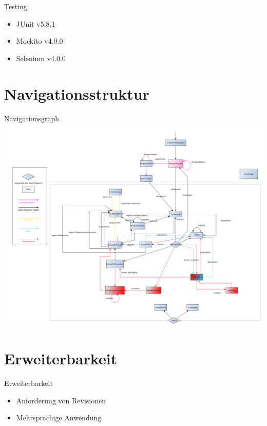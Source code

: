 \documentclass{beamer}
\begin{document}
    \begin{frame}{Testing}
        \begin{itemize}
            \item JUnit v5.8.1
            \item Mockito v4.0.0
            \item Selenium v4.0.0
        \end{itemize}
    \end{frame}


    \section{Navigationsstruktur}
    \begin{frame}{Navigationsgraph}
        \centering
        \includegraphics[height=0.8\textheight]{../../docs/Pflichtenheft/graphics/benutzerFlussyEd-png}
    \end{frame}


    \section{Erweiterbarkeit}

    \begin{frame}{Erweiterbarkeit}
        \pause
        \begin{itemize}
            \item Anforderung von Revisionen
            \pause
            \item Mehrsprachige Anwendung
        \end{itemize}
    \end{frame}
\end{document}

